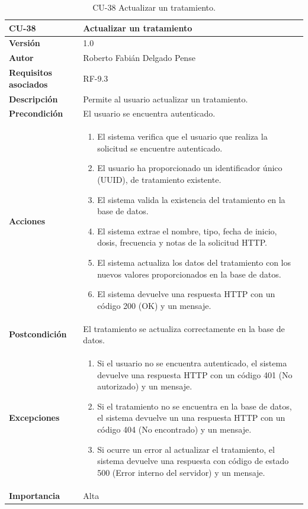 \begin{table}[p]
	\centering
	\begin{tabularx}{\linewidth}{ p{} p{} }
		\toprule
		\textbf{CU-38}    & \textbf{Actualizar un tratamiento}\\
		\toprule
		\textbf{Versión}              & 1.0    \\
		\textbf{Autor}                & Roberto Fabián Delgado Pense \\
		\textbf{Requisitos asociados} & RF-9.3 \\ 
		\textbf{Descripción}          & Permite al usuario actualizar un tratamiento. \\
		\textbf{Precondición}         & El usuario se encuentra autenticado.\\
		\textbf{Acciones}             &
		\begin{enumerate}
			\def\labelenumi{\arabic{enumi}.}
			\tightlist
                \item El sistema verifica que el usuario que realiza la solicitud se encuentre autenticado.
			\item El usuario ha proporcionado un identificador único (UUID), de tratamiento existente.
			\item El sistema valida la existencia del tratamiento en la base de datos.
                \item El sistema extrae el nombre, tipo, fecha de inicio, dosis, frecuencia y notas de la solicitud HTTP.
                \item El sistema actualiza los datos del tratamiento con los nuevos valores proporcionados en la base de datos.
                \item El sistema devuelve una respuesta HTTP con un código 200 (OK) y un mensaje.
            \end{enumerate}\\
		\textbf{Postcondición}        & El tratamiento se actualiza correctamente en la base de datos.\\
		\textbf{Excepciones}          & 
            \begin{enumerate}
			\def\labelenumi{\arabic{enumi}.}
			\tightlist
   			\item Si el usuario no se encuentra autenticado, el sistema devuelve una                 respuesta HTTP con un código 401 (No autorizado) y un mensaje.
                \item   Si el tratamiento no se encuentra en la base de datos, el sistema devuelve un                           una respuesta HTTP con un código 404 (No encontrado) y un mensaje. 
                \item Si ocurre un error al actualizar el tratamiento, el sistema devuelve una respuesta con código de estado 500 (Error interno del servidor) y un mensaje.
            \end{enumerate}\\
		\textbf{Importancia}          & Alta \\
		\bottomrule
	\end{tabularx}
	\caption{CU-38 Actualizar un tratamiento.}
\end{table}

